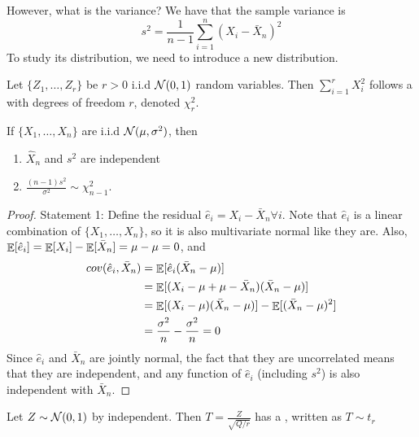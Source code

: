 \documentclass[10pt]{article}
\begin{document}
However, what is the variance? We have that the sample variance is
\[
s^2 = \frac{1}{n-1} \sum_{i=1}^n (X_i - \bar{X}_n)^2
\]
To study its distribution, we need to introduce a new distribution.

\begin{definition}
	Let $\{Z_1,\dots,Z_r\}$ be $r > 0$ i.i.d $\mathcal{N}(0,1)$ random variables. Then $\sum_{i=1}^r X_i^2$ follows a  with degrees of freedom $r$, denoted $\chi_r^2$.
\end{definition}

\begin{theorem}
	If $\{X_1,\dots,X_n\}$ are i.i.d $\mathcal{N}(\mu,\sigma^2)$, then 
	\begin{enumerate}
		\item $\hat{X}_n$ and $s^2$ are independent
		\item $\frac{(n-1)s^2}{\sigma^2} \sim \chi^2_{n-1}$.
	\end{enumerate}
\end{theorem}
\begin{proof}
	Statement 1: Define the residual $\hat{e}_i = X_i - \bar{X}_n \forall i$. Note that $\hat{e}_i$ is a linear combination of $\{X_1,\dots,X_n\}$, so it is also multivariate normal like they are. Also, $\mathop{\mathbb{E}}[\hat{e}_i] = \mathop{\mathbb{E}}[X_i] - \mathop{\mathbb{E}}[\bar{X}_n] = \mu - \mu = 0$, and 
	\begin{align*}
		cov(\hat{e}_i,\bar{X}_n) &= \mathop{\mathbb{E}}[\hat{e}_i(\bar{X}_n - \mu)] \\
		&= \mathop{\mathbb{E}}[ (X_i - \mu + \mu - \bar{X}_n)(\bar{X}_n - \mu)] \\
		&= \mathop{\mathbb{E}}[(X_i - \mu)(\bar{X}_n - \mu)] - \mathop{\mathbb{E}}[(\bar{X}_n - \mu)^2] \\
		&= \frac{\sigma^2}{n	} - \frac{\sigma^2}{n} = 0
	\end{align*} 
	Since $\hat{e}_i$ and $\bar{X}_n$ are jointly normal, the fact that they are uncorrelated means that they are independent, and any function of $\hat{e}_i$ (including $s^2$) is also independent with $\bar{X}_n$.
\end{proof}

\begin{definition}
	Let $Z \sim \mathcal{N}(0,1)$ by independent. Then $T = \frac{Z}{\sqrt{Q / r}}$ has a , written as $T \sim t_r$
\end{definition}
\end{document}
